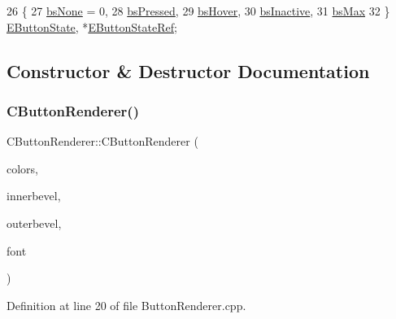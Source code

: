 \begin{DoxyCode}
26                     \{
27             \hyperlink{classCButtonRenderer_ae0eccda184600f6e14bfd59033e5e9a1aa0cd7277705307bef6c50f2250b5d62d}{bsNone} = 0,
28             \hyperlink{classCButtonRenderer_ae0eccda184600f6e14bfd59033e5e9a1a8fad69630f3700a97a0c51bcbb4441b5}{bsPressed},
29             \hyperlink{classCButtonRenderer_ae0eccda184600f6e14bfd59033e5e9a1ad6758a415bde0eee152a0e2f7d07e3b6}{bsHover},
30             \hyperlink{classCButtonRenderer_ae0eccda184600f6e14bfd59033e5e9a1a982d739b5c4b45ebf0b20a4c205a3531}{bsInactive},
31             \hyperlink{classCButtonRenderer_ae0eccda184600f6e14bfd59033e5e9a1aa674e22146de8dfe27c5c1ad64f3e1bd}{bsMax}
32         \} \hyperlink{classCButtonRenderer_ae0eccda184600f6e14bfd59033e5e9a1}{EButtonState}, *\hyperlink{classCButtonRenderer_a402e6dc71de924ff3daf036e31048ce7}{EButtonStateRef};
\end{DoxyCode}


\subsection{Constructor \& Destructor Documentation}
\hypertarget{classCButtonRenderer_a168e60a1e237820d58b4667003340aaf}{}\label{classCButtonRenderer_a168e60a1e237820d58b4667003340aaf} 
\subsubsection{\texorpdfstring{C\+Button\+Renderer()}{CButtonRenderer()}}
{\footnotesize\ttfamily C\+Button\+Renderer\+::\+C\+Button\+Renderer (\begin{DoxyParamCaption}\item[{std\+::shared\+\_\+ptr$<$ \hyperlink{classCGraphicTileset}{C\+Graphic\+Tileset} $>$}]{colors,  }\item[{std\+::shared\+\_\+ptr$<$ \hyperlink{classCBevel}{C\+Bevel} $>$}]{innerbevel,  }\item[{std\+::shared\+\_\+ptr$<$ \hyperlink{classCBevel}{C\+Bevel} $>$}]{outerbevel,  }\item[{std\+::shared\+\_\+ptr$<$ \hyperlink{classCFontTileset}{C\+Font\+Tileset} $>$}]{font }\end{DoxyParamCaption})}



Definition at line 20 of file Button\+Renderer.\+cpp.



